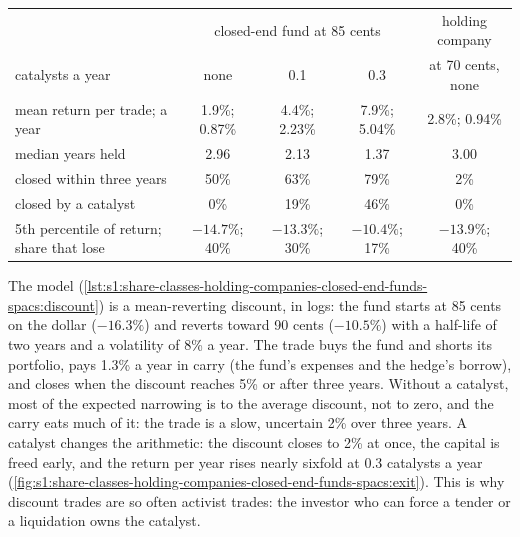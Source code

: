 \begin{center}
\small
\begin{tabular}{@{}lcccc@{}}
\toprule
& \multicolumn{3}{c}{closed-end fund at 85 cents} & holding company\\
catalysts a year & none & 0.1 & 0.3 & at 70 cents, none\\
\midrule
mean return per trade; a year & 1.9\%; 0.87\% & 4.4\%; 2.23\% & 7.9\%; 5.04\% & 2.8\%; 0.94\%\\
median years held & 2.96 & 2.13 & 1.37 & 3.00\\
closed within three years & 50\% & 63\% & 79\% & 2\%\\
closed by a catalyst & 0\% & 19\% & 46\% & 0\%\\
5th percentile of return; share that lose & $-14.7\%$; 40\% & $-13.3\%$; 30\% & $-10.4\%$; 17\% & $-13.9\%$; 40\%\\
\bottomrule
\end{tabular}
\end{center}

The model (\cref{lst:s1:share-classes-holding-companies-closed-end-funds-spacs:discount}) is a mean-reverting discount, in logs: the fund starts at 85 cents
on the dollar ($-16.3\%$) and reverts toward 90 cents ($-10.5\%$) with a half-life of two years and a volatility of 8\% a year. The trade buys the fund and
shorts its portfolio, pays 1.3\% a year in carry (the fund's expenses and the hedge's borrow), and closes when the discount reaches 5\% or after three years.
Without a catalyst, most of the expected narrowing is to the average discount, not to zero, and the carry eats much of it: the trade is a slow, uncertain
2\% over three years. A catalyst changes the arithmetic: the discount closes to 2\% at once, the capital is freed early, and the return per year rises
nearly sixfold at 0.3 catalysts a year (\cref{fig:s1:share-classes-holding-companies-closed-end-funds-spacs:exit}). This is why discount trades are so often
activist trades: the investor who can force a tender or a liquidation owns the catalyst.

